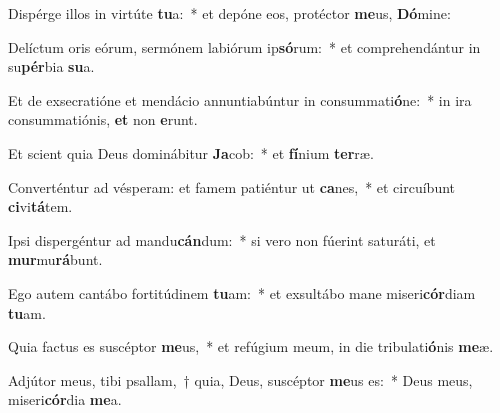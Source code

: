 \item Dispérge illos in virtúte \textbf{tu}a:~* et depóne eos, protéctor \textbf{me}us, \textbf{Dó}mine:
\item Delíctum oris eórum, sermónem labiórum ip\textbf{só}rum:~* et comprehendántur in su\textbf{pér}bia \textbf{su}a.
\item Et de exsecratióne et mendácio annuntiabúntur in consummati\textbf{ó}ne:~* in ira consummatiónis, \textbf{et} non \textbf{e}runt.
\item Et scient quia Deus dominábitur \textbf{Ja}cob:~* et \textbf{fí}nium \textbf{ter}ræ.
\item Converténtur ad vésperam: et famem patiéntur ut \textbf{ca}nes,~* et circuíbunt \textbf{ci}vi\textbf{tá}tem.
\item Ipsi dispergéntur ad mandu\textbf{cán}dum:~* si vero non fúerint saturáti, et \textbf{mur}mu\textbf{rá}bunt.
\item Ego autem cantábo fortitúdinem \textbf{tu}am:~* et exsultábo mane miseri\textbf{cór}diam \textbf{tu}am.
\item Quia factus es suscéptor \textbf{me}us,~* et refúgium meum, in die tribulati\textbf{ó}nis \textbf{me}æ.
\item Adjútor meus, tibi psallam,~† quia, Deus, suscéptor \textbf{me}us es:~* Deus meus, miseri\textbf{cór}dia \textbf{me}a.
